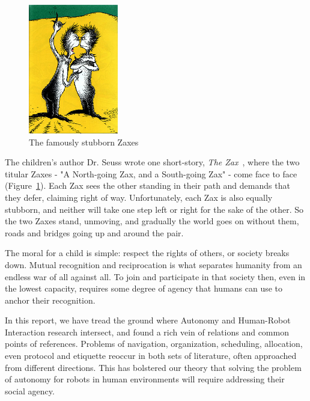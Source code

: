 \documentclass{sfuthesis}
\begin{document}
\begin{figure}
    \centering
    \includegraphics[width=0.35\textwidth]{Zax.jpg} 

    \caption{The famously stubborn Zaxes}
    \label{fig:zaxes}
\end{figure}

The children's author Dr. Seuss wrote one short-story, \textit{The Zax}~\cite{seuss1953zax}, where the two titular Zaxes - "A North-going Zax, and a South-going Zax" - come face to face (Figure~\ref{fig:zaxes}). Each Zax sees the other standing in their path and demands that they defer, claiming right of way. Unfortunately, each Zax is also equally stubborn, and neither will take one step left or right for the sake of the other. So the two Zaxes stand, unmoving, and gradually the world goes on without them, roads and bridges going up and around the pair.

The moral for a child is simple: respect the rights of others, or society breaks down. Mutual recognition and reciprocation is what separates humanity from an endless war of all against all. To join and participate in that society then, even in the lowest capacity, requires some degree of agency that humans can use to anchor their recognition.

In this report, we have tread the ground where Autonomy and Human-Robot Interaction research intersect, and found a rich vein of relations and common points of references. Problems of navigation, organization, scheduling, allocation, even protocol and etiquette reoccur in both sets of literature, often approached from different directions. This has bolstered our theory that solving the problem of autonomy for robots in human environments will require addressing their social agency.
\end{document}
